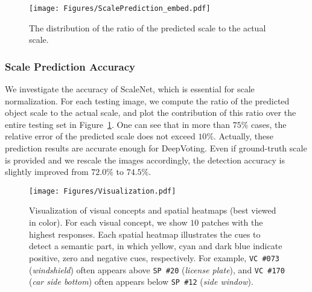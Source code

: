 \documentclass[10pt,twocolumn,letterpaper]{article}
\begin{document}
  \begin{figure}[t!]
  \centering
  \texttt{[image: Figures/ScalePrediction\_embed.pdf]}
  \caption{
  The distribution of the ratio of the predicted scale to the actual scale.
  }
  \label{Fig:ScalePrediction}
  \end{figure}


  \subsubsection{Scale Prediction Accuracy}
  \label{Experiments:NonOcclusion:ScalePrediction}

  We investigate the accuracy of ScaleNet, which is essential for scale normalization. For each testing image, we compute the ratio of the predicted object scale to the actual scale, and plot the contribution of this ratio over the entire testing set in Figure~\ref{Fig:ScalePrediction}. One can see that in more than $75\%$ cases, the relative error of the predicted scale does not exceed $10\%$. Actually, these prediction results are accurate enough for DeepVoting. Even if ground-truth scale is provided and we rescale the images accordingly, the detection accuracy is slightly improved from $72.0\%$ to $74.5\%$.

  \begin{figure*}[t!]
  \centering
  \texttt{[image: Figures/Visualization.pdf]}
  \caption{
  Visualization of visual concepts and spatial heatmaps (best viewed in color). For each visual concept, we show $10$ patches with the highest responses. Each spatial heatmap illustrates the cues to detect a semantic part, in which yellow, cyan and dark blue indicate positive, zero and negative cues, respectively. For example, {\tt VC \#073} ({\em windshield}) often appears above {\tt SP \#20} ({\em license plate}), and {\tt VC \#170} ({\em car side bottom}) often appears below {\tt SP \#12} ({\em side window}).
  }
  \label{Fig:Visualization}
  \end{figure*}
\end{document}

